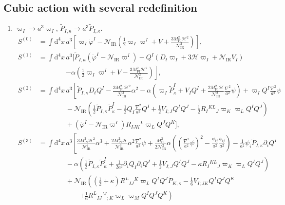 \documentclass[aps, prd
, preprint
, nofootinbib 
, longbibliography
]{revtex4-1}
\newcommand{\dd}{\mathrm{d}}
\newcommand{\Mpl}{M_\mathrm{Pl}}
\newcommand{\IR}{\mathrm{IR}}
\newcommand{\calH}{\mathcal{H}}
\newcommand{\calN}{\mathcal{N}}
\newcommand{\bae}[1]{\begin{align} #1 \end{align}}
\begin{document}
\subsection{Cubic action with several redefinition}

\begin{enumerate}
\item $\varpi_I\to a^3\varpi_I$, $\tilde{P}_{I,\kappa}\to a^3\tilde{P}_{I,\kappa}$.
\bae{
    S^{(0)}&=\int\dd^4x\,a^3\left[\varpi_I\dot{\varphi}^I-\calN_\IR\left(\frac{1}{2}\varpi_I\varpi^I+V+\frac{3\Mpl^2\calH^2}{\calN_\IR^2}\right)\right], \\
    S^{(1)}&=\int\dd^4x\,a^3\biggl[\tilde{P}_{I,\kappa}\left(\dot{\varphi}^I-\calN_\IR\varpi^I\right)-Q^I\left(D_t\varpi_I+3\calH\varpi_I+\calN_\IR V_I\right) \nonumber \\
    &\qquad\qquad\left.-\alpha\left(\frac{1}{2}\varpi_I\varpi^I+V-\frac{3\Mpl^2\calH^2}{\calN_\IR^2}\right)\right], \\
    S^{(2)}&=\int\dd^4x\,a^3\left[\tilde{P}_{I,\kappa}D_tQ^I-\frac{3\Mpl^2\calH^2}{\calN_\IR^3}\alpha^2-\alpha\left(\varpi_I\tilde{P}^I_\kappa+V_IQ^I+\frac{2\Mpl^2\calH}{\calN_\IR^2}\frac{\nabla^2}{a^2}\psi\right)+\varpi_IQ^I\frac{\nabla^2}{a^2}\psi \right. \nonumber \\
    &\qquad\qquad -\calN_\IR\left(\frac{1}{2}\tilde{P}_{I,\kappa}\tilde{P}^I_\kappa-\frac{1}{2}Q_I\frac{\nabla^2}{a^2}Q^I+\frac{1}{2}V_{I;J}Q^IQ^J-\frac{1}{2}R_I{}^{KL}{}_J\varpi_K\varpi_LQ^IQ^J\right)\nonumber \\
    &\qquad\qquad+\left(\dot{\varphi}^I-\calN_\IR\varpi^I\right)R_{IJK}{}^L\varpi_LQ^JQ^K\biggr], \\
    S^{(3)}&=\int\dd^4x\,a^3\left[\frac{3\Mpl^2\calH^2}{\calN_\IR^4}\alpha^3+\frac{2\Mpl^2\calH}{\calN_\IR^3}\alpha^2\frac{\nabla^2}{a^2}\psi+\frac{\Mpl^2}{2\calN_\IR^2}\alpha\left(\left(\frac{\nabla^2}{a^2}\psi\right)^2-\frac{\psi_{ij}}{a^2}\frac{\psi_{ij}}{a^2}\right)-\frac{1}{a^2}\psi_i\tilde{P}_{I,\kappa}\partial_iQ^I \right. \nonumber \\
    &\qquad\qquad -\alpha\left(\frac{1}{2}\tilde{P}_{I,\kappa}\tilde{P}^I_\kappa+\frac{1}{2a^2}\partial_iQ_I\partial_iQ^I+\frac{1}{2}V_{I;J}Q^IQ^J-\kappa R_I{}^{KL}{}_J\varpi_K\varpi_LQ^IQ^J\right) \nonumber \\
    &\qquad\qquad +\calN_\IR\left(\left(\frac{1}{2}+\kappa\right)R^L{}_{IJ}{}^K\varpi_LQ^IQ^J\tilde{P}_{K,\kappa}-\frac{1}{6}V_{I;JK}Q^IQ^JQ^K \right. \nonumber \\
    &\qquad\qquad\qquad \left. +\frac{1}{6}R^L{}_{IJ}{}^M{}_{;K}\varpi_L\varpi_MQ^IQ^JQ^K\right)\nonumber \\
}
\end{enumerate}
\end{document}

